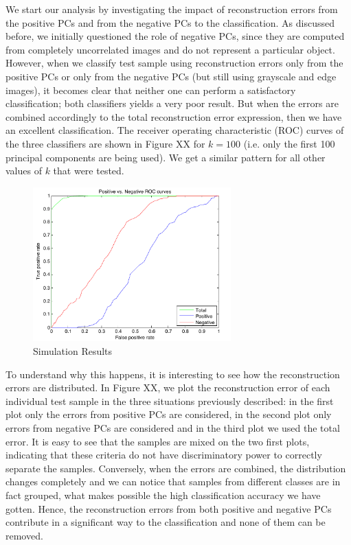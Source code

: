 \documentclass[10pt, conference, compsocconf]{IEEEtran}
\begin{document}
We start our analysis by investigating the impact of reconstruction errors from the positive PCs and from the negative PCs to the classification. As discussed before, we initially questioned the role of negative PCs, since they are computed from completely uncorrelated images and do not represent a particular object. However, when we classify test sample using reconstruction errors only from the positive PCs or only from the negative PCs (but still using grayscale and edge images), it becomes clear that neither one can perform a satisfactory classification; both classifiers yields a very poor result. But when the errors are combined accordingly to the total reconstruction error expression, then we have an excellent classification. The receiver operating characteristic (ROC) curves of the three classifiers are shown in Figure XX for $k = 100$ (i.e. only the first 100 principal components are being used). We get a similar pattern for all other values of $k$ that were tested.

\begin{figure}[t]
\centering
\includegraphics[width=3in]{roc_pos_vs_neg}
\caption{Simulation Results}
\label{roc_pos_vs_neg}
\end{figure}

To understand why this happens, it is interesting to see how the reconstruction errors are distributed. In Figure XX, we plot the reconstruction error of each individual test sample in the three situations previously described: in the first plot only the errors from positive PCs are considered, in the second plot only errors from negative PCs are considered and in the third plot we used the total error. It is easy to see that the samples are mixed on the two first plots, indicating that these criteria do not have discriminatory power to correctly separate the samples. Conversely, when the errors are combined, the distribution changes completely and we can notice that samples from different classes are in fact grouped, what makes possible the high classification accuracy we have gotten. Hence, the reconstruction errors from both positive and negative PCs contribute in a significant way to the classification and none of them can be removed.
\end{document}
